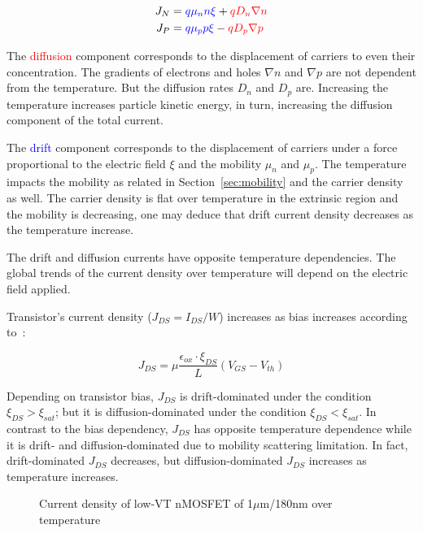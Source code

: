 \begin{align}
\label{eqn:current_density}
J_N &= \textcolor{blue}{q\mu_n n \xi} + \textcolor{red}{qD_n\nabla n} \\
J_P &= \textcolor{blue}{q\mu_p p \xi} - \textcolor{red}{qD_p\nabla p} 
\end{align}

The \textcolor{red}{diffusion} component corresponds to the displacement of carriers to even their concentration. The gradients of electrons and holes \(\nabla n \) and \(\nabla p \) are not dependent from the temperature. But the diffusion rates \(D_n \) and \(D_p \) are. Increasing the temperature increases particle kinetic energy, in turn, increasing the diffusion component of the total current.

The \textcolor{blue}{drift} component corresponds to the displacement of carriers under a force proportional to the electric field \(\xi \) and the mobility \(\mu_n \) and \(\mu_p \). The temperature impacts the mobility as related in Section~\ref{sec:mobility} and the carrier density as well. The carrier density is flat over temperature in the extrinsic region and the mobility is decreasing, one may deduce that drift current density decreases as the temperature increase.

The drift and diffusion currents have opposite temperature dependencies. The global trends of the current density over temperature will depend on the electric field applied.

Transistor's current density (\(J_{DS} = I_{DS}/W\)) increases as bias increases according to~\cite{Sze1981}:

\begin{equation}
J_{DS} = \mu \frac{\epsilon_{ox} \cdot \xi_{DS}}{L} \left(V_{GS}-V_{th}\right)
\label{eqn:JDS}
\end{equation}

Depending on transistor bias, \(J_{DS}\) is drift-dominated under the condition \(\xi_{DS} > \xi_{sat}\); but it is diffusion-dominated under the condition \(\xi_{DS} < \xi_{sat}\). In contrast to the bias dependency, \(J_{DS}\) has opposite temperature dependence while it is drift- and \allowbreak diffusion-dominated due to mobility scattering limitation. In fact, drift-dominated \(J_{DS}\) decreases, but diffusion-dominated \(J_{DS}\) increases as temperature increases.

\begin{figure}[!ht]
	\centering
	
	\caption{Current density of low-VT nMOSFET of 1\(\mu \)m/180nm over temperature}
	\label{fig:jds_nel}
\end{figure}


